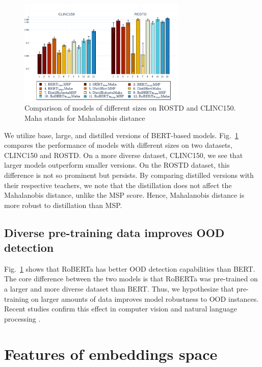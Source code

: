\documentclass[letterpaper, final]{article} %
\begin{document}
\begin{figure}[ht]%
    \centering
    \includegraphics[width=8cm]{images/aupr_clinc_rostd}
    \caption{Comparison of models of different sizes on ROSTD and CLINC150. Maha stands for Mahalanobis distance}
    \label{fig:model_size_aupr_ood}
\end{figure}


We utilize base, large, and distilled versions of BERT-based models. Fig.~\ref{fig:model_size_aupr_ood} compares the performance of models with different sizes on two datasets, CLINC150 and ROSTD. On a more diverse dataset, CLINC150, we see that larger models outperform smaller versions. On the ROSTD dataset, this difference is not so prominent but persists. By comparing distilled versions with their respective teachers, we note that the distillation does not affect the Mahalanobis distance, unlike the MSP score. Hence, Mahalanobis distance is more robust to distillation than MSP. 

\subsection{Diverse pre-training data improves OOD detection}

 Fig.~\ref{fig:model_size_aupr_ood} shows that RoBERTa has better OOD detection capabilities than BERT. The core difference between the two models is that RoBERTa was pre-trained on a larger and more diverse dataset than BERT. Thus, we hypothesize that pre-training on larger amounts of data improves model robustness to OOD instances. Recent studies confirm this effect in computer vision \cite{hendrycks_pretraining19,orhan2019robustness} and natural language processing \cite{Hendrycks2020PretrainedTI}.
 
\section{Features of embeddings space} 
\end{document}
